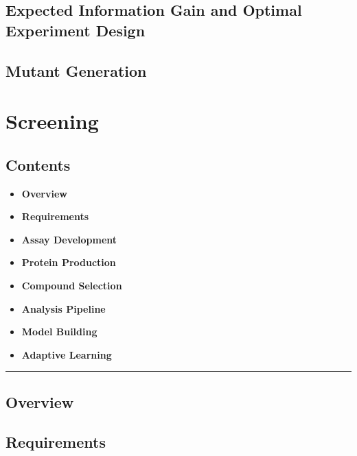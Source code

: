 \hypertarget{expected-information-gain-and-optimal-experiment-design}{%
\subsection{Expected Information Gain and Optimal Experiment
Design}\label{expected-information-gain-and-optimal-experiment-design}}

\hypertarget{mutant-generation-1}{%
\subsection{Mutant Generation}\label{mutant-generation-1}}

\hypertarget{screening}{%
\section{Screening}\label{screening}}

\hypertarget{contents-20}{%
\subsection{Contents}\label{contents-20}}

\begin{itemize}
\tightlist
\item
  \textbf{Overview}
\item
  \textbf{Requirements}
\item
  \textbf{Assay Development}
\item
  \textbf{Protein Production}
\item
  \textbf{Compound Selection}
\item
  \textbf{Analysis Pipeline}
\item
  \textbf{Model Building}
\item
  \textbf{Adaptive Learning}
\end{itemize}

\begin{center}\rule{0.5\linewidth}{0.5pt}\end{center}

\hypertarget{overview-10}{%
\subsection{Overview}\label{overview-10}}

\hypertarget{requirements}{%
\subsection{Requirements}\label{requirements}}

